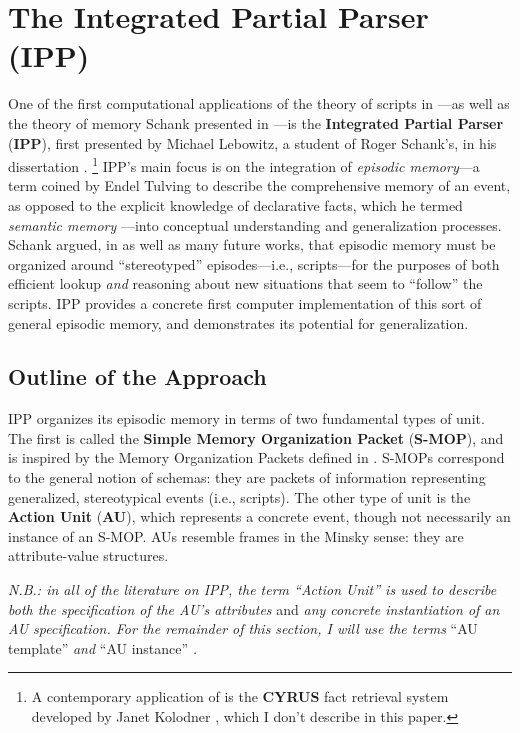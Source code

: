 \section{The Integrated Partial Parser (IPP)}
\label{sec:ipp}

One of the first computational applications of the theory of scripts in \citep{schankandabelson}---as well as the theory of memory Schank presented in \citep{schank1982dynamic}---is the \textbf{Integrated Partial Parser} (\textbf{IPP}), first presented by Michael Lebowitz, a student of Roger Schank's, in his dissertation \citep{lebowitz1980}. \footnote{A contemporary application of \citep{schank1982dynamic} is the \textbf{CYRUS} fact retrieval system developed by Janet Kolodner \citep{kolodner1983maintaining}, which I don't describe in this paper.} IPP's main focus is on the integration of \textit{episodic memory}---a term coined by Endel Tulving to describe the comprehensive memory of an event, as opposed to the explicit knowledge of declarative facts, which he termed \textit{semantic memory} \citep{tulving1972episodic}---into conceptual understanding and generalization processes. Schank argued, in \citep{schankandabelson} as well as many future works, that episodic memory must be organized around ``stereotyped'' episodes---i.e., scripts---for the purposes of both efficient lookup \textit{and} reasoning about new situations that seem to ``follow'' the scripts. IPP provides a concrete first computer implementation of this sort of general episodic memory, and demonstrates its potential for generalization.

\subsection{Outline of the Approach}

IPP organizes its episodic memory in terms of two fundamental types of unit. The first is called the \textbf{Simple Memory Organization Packet} (\textbf{S-MOP}), and is inspired by the Memory Organization Packets defined in \citep{schank1980language}. S-MOPs correspond to the general notion of schemas: they are packets of information representing generalized, stereotypical events (i.e., scripts). The other type of unit is the \textbf{Action Unit} (\textbf{AU}), which represents a concrete event, though not necessarily an instance of an S-MOP. AUs resemble frames in the Minsky sense: they are attribute-value structures.

\textit{N.B.: in all of the literature on IPP, the term ``Action Unit'' is used to describe both the specification of the AU's attributes} and \textit{any concrete instantiation of an AU specification. For the remainder of this section, I will use the terms} ``AU template'' \textit{and} ``AU instance'' \textit{.}

